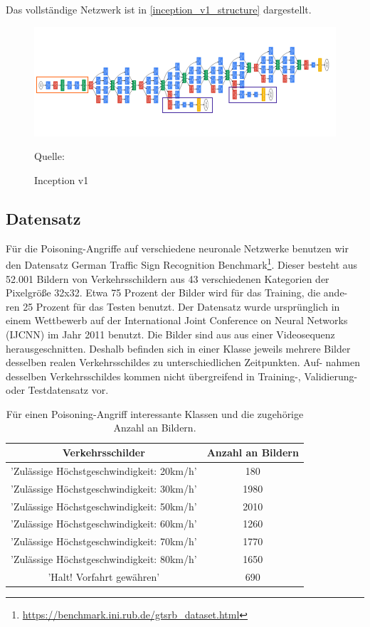 \documentclass[11pt,a4paper]{article}
\newcommand{\source}[1]{\caption*{\hfill Quelle: {#1}} }
\numberwithin{equation}{section}
\begin{document}
	Das vollständige Netzwerk ist in \autoref{inception_v1_structure} dargestellt.
	
	\begin{figure}
		\centering
		
			\centering
			\includegraphics[width=.7\linewidth]{inception_v1_structure.png}
		
		\caption{Inception v1}
		\source{\cite{goingdeeperwithconvolutions}}
		
		\label{inception_v1_structure}
	\end{figure}
	
	
	

	\subsection{Datensatz}
	
	
	Für die Poisoning-Angriffe auf verschiedene neuronale Netzwerke benutzen wir
	den Datensatz German Traffic Sign Recognition Benchmark\footnote{\url{https://benchmark.ini.rub.de/gtsrb_dataset.html}}. Dieser besteht
	aus 52.001 Bildern von Verkehrsschildern aus 43 verschiedenen Kategorien der
	Pixelgröße 32x32. Etwa 75 Prozent der Bilder wird für das Training, die ande-
	ren 25 Prozent für das Testen benutzt. Der Datensatz wurde ursprünglich in
	einem Wettbewerb auf der International Joint Conference on Neural Networks
	(IJCNN) im Jahr 2011 benutzt. Die Bilder sind aus aus einer Videosequenz
	herausgeschnitten. Deshalb befinden sich in einer Klasse jeweils mehrere Bilder desselben realen Verkehrsschildes zu unterschiedlichen Zeitpunkten. Auf-
	nahmen desselben Verkehrsschildes kommen nicht übergreifend in Training-,
	Validierung- oder Testdatensatz vor.
	
	\begin{table}[h]
		\begin{tabular}[h]{c|c}
			Verkehrsschilder & Anzahl an Bildern \\ \hline
			’Zulässige Höchstgeschwindigkeit: 20km/h’& 180 \\
			’Zulässige Höchstgeschwindigkeit: 30km/h’ & 1980 \\
			’Zulässige Höchstgeschwindigkeit: 50km/h’	& 2010 \\
			’Zulässige Höchstgeschwindigkeit: 60km/h’	& 1260 \\
			’Zulässige Höchstgeschwindigkeit: 70km/h’	& 1770 \\
			’Zulässige Höchstgeschwindigkeit: 80km/h’	&1650 \\
			’Halt! Vorfahrt gewähren’					&	690
		\end{tabular}
		
		\caption[Verteilung bestimmter Verkehrsschilder im Datensatz]{Für einen Poisoning-Angriff interessante Klassen und die zugehörige Anzahl an Bildern.}
		\label{hallo}
	\end{table}
	
\end{document}
